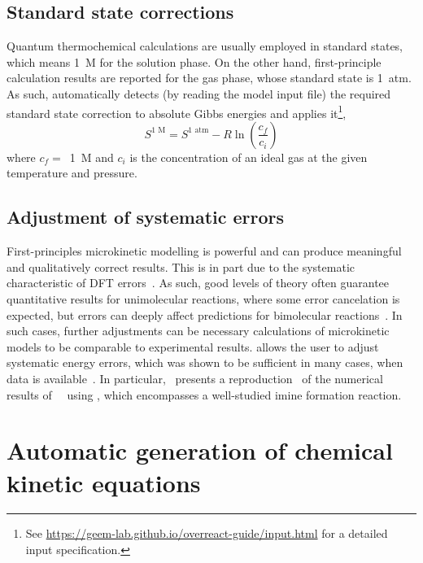 \subsection{Standard state corrections}

Quantum thermochemical calculations are usually employed in standard states,
which means 1~M for the solution phase.
On the other hand,
first-principle calculation results are reported for the gas phase,
whose standard state is 1~atm.
As such,
\overreact automatically detects (by reading the model input file) the required standard state correction to absolute Gibbs energies and applies it\footnote{See \url{https://geem-lab.github.io/overreact-guide/input.html} for a detailed input specification.},
% 
\begin{equation}
	S^\text{1~M} = S^\text{1~atm}
	- R \ln{\left( \frac{c_f}{c_i} \right)}
\end{equation}
% 
where $c_f =$~1~M and $c_i$ is the concentration of an ideal gas at the given temperature and pressure.

\subsection{Adjustment of systematic errors}

First-principles microkinetic modelling is powerful and can produce meaningful and qualitatively correct results.
This is in part due to the systematic characteristic of DFT errors~\cite{P_rez_Soto_2020}.
As such,
good levels of theory often guarantee quantitative results for unimolecular reactions,
where some error cancelation is expected,
but errors can deeply affect predictions for bimolecular reactions~\cite{P_rez_Soto_2020}.
In such cases,
further adjustments can be necessary calculations of microkinetic models to be comparable to experimental results.
\overreact allows the user to adjust systematic energy errors,
which was shown to be sufficient in many cases,
when data is available~\cite{Ahn_2019,P_rez_Soto_2020}.
In particular,~\citeauthor{Schneider_2022} presents a reproduction~\cite{Schneider_2022} of the numerical results of~\citeauthor{P_rez_Soto_2020}~\cite{P_rez_Soto_2020} using \overreact,
which encompasses a well-studied imine formation reaction.

\section{Automatic generation of chemical kinetic equations}

